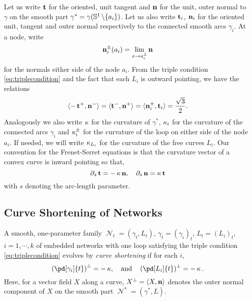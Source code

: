 \documentclass[11pt]{amsart}
\DeclareMathOperator{\network}{\mathcal{N}}
\begin{document}
Let us write \(\operatorname{\mathbf{t}}\) for the oriented, unit tangent and \(\operatorname{\mathbf{n}}\) for the unit, outer normal to \(\gamma\) on the smooth part \(\gamma^{\ast} = \gamma(\mathbb{S}^1\operatorname{\backslash}\{a_i\})\). Let us also write \(\operatorname{\mathbf{t}}_i\), \(\operatorname{\mathbf{n}}_i\) for the oriented unit, tangent and outer normal respectively to the connected smooth arcs \(\gamma_i\). At a node, write
\[
\operatorname{\mathbf{n}}_i^{\pm}(a_i) = \lim_{x\to a_i^{\pm}} \operatorname{\mathbf{n}}
\]
for the normals either side of the node \(a_i\). From the triple condition \eqref{eq:triplecondition} and the fact that each \(L_i\) is outward pointing, we have the relations
\begin{equation}
\label{eq:triplerelations}
\langle{-\operatorname{\mathbf{t}}^+},{\operatorname{\mathbf{n}}^-}\rangle = \langle{\operatorname{\mathbf{t}}^-},{\operatorname{\mathbf{n}}^+}\rangle = \langle{\operatorname{\mathbf{n}}_i^{\pm}},{\operatorname{\mathbf{t}}_i}\rangle = \frac{\sqrt{3}}{2}.
\end{equation}
Analogously we also write \(\operatorname{\kappa}\) for the curvature of \(\gamma^{\ast}\), \(\operatorname{\kappa}_i\) for the curvature of the connected arcs \(\gamma_i\) and \(\operatorname{\kappa}^{\pm}_i\) for the curvature of the loop on either side of the node \(a_i\). If needed, we will write \(\operatorname{\kappa}_{L_i}\) for the curvature of the free curves \(L_i\). Our convention for the Frenet-Serret equations is that the curvature vector of a convex curve is inward pointing so that,
\begin{equation}
\label{eq:frenetserret}
\partial_s \operatorname{\mathbf{t}} = -\operatorname{\kappa} \operatorname{\mathbf{n}}, \quad \partial_s \operatorname{\mathbf{n}} = \operatorname{\kappa} \operatorname{\mathbf{t}}
\end{equation}
with \(s\) denoting the arc-length parameter.

\subsection{Curve Shortening of Networks}
\label{sec:orgheadline3}

\begin{defn}
A smooth, one-parameter family \(\network_t = (\gamma_t, L_t)\), \(\gamma_t = (\gamma_i)_t\), \(L_t = (L_i)_t\), \(i=1,\cdots,k\) of embedded networks with one loop satisfying the triple condition \eqref{eq:triplecondition} evolves by \emph{curve shortening} if for each \(i\),
\begin{equation}
\label{eq:csf}
\left(\pd[\gamma_i]{t}\right)^{\perp} = -\curvecurv, \quad \text{and} \quad \left(\pd[L_i]{t}\right)^{\perp} = -\curvecurv.
\end{equation}
Here, for a vector field \(X\) along a curve, \(X^{\perp} = \langle{X},{\operatorname{\mathbf{n}}}\rangle\) denotes the outer normal component of \(X\) on the smooth part \(\network^{\ast} = (\gamma^{\ast}, L)\).
\end{defn}
\end{document}
